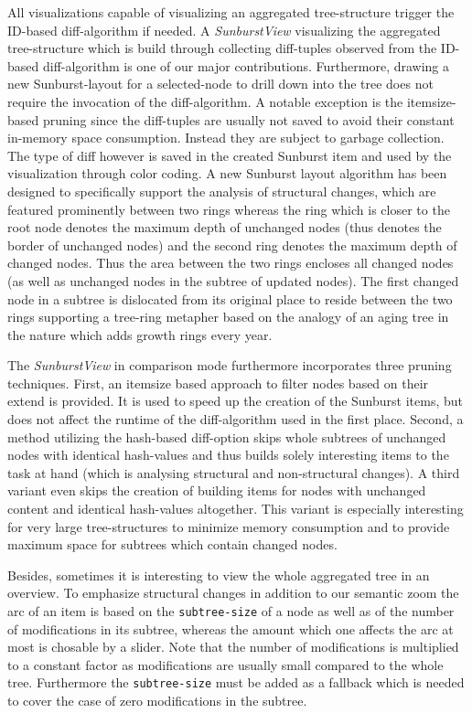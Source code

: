 All visualizations capable of visualizing an aggregated tree-structure trigger the ID-based diff-algorithm if needed. A \emph{SunburstView} visualizing the aggregated tree-structure which is build through collecting diff-tuples observed from the ID-based diff-algorithm is one of our major contributions. Furthermore, drawing a new Sunburst-layout for a selected-node to drill down into the tree does not require the invocation of the diff-algorithm. A notable exception is the itemsize-based pruning since the diff-tuples are usually not saved to avoid their constant in-memory space consumption. Instead they are subject to garbage collection. The type of diff however is saved in the created Sunburst item and used by the visualization through color coding. A new Sunburst layout algorithm has been designed to specifically support the analysis of structural changes, which are featured prominently between two rings whereas the ring which is closer to the root node denotes the maximum depth of unchanged nodes (thus denotes the border of unchanged nodes) and the second ring denotes the maximum depth of changed nodes. Thus the area between the two rings encloses all changed nodes (as well as unchanged nodes in the subtree of updated nodes). The first changed node in a subtree is dislocated from its original place to reside between the two rings supporting a tree-ring metapher based on the analogy of an aging tree in the nature which adds growth rings every year.

The \emph{SunburstView} in comparison mode furthermore incorporates three pruning techniques. First, an itemsize based approach to filter nodes based on their extend is provided. It is used to speed up the creation of the Sunburst items, but does not affect the runtime of the diff-algorithm used in the first place. Second, a method utilizing the hash-based diff-option skips whole subtrees of unchanged nodes with identical hash-values and thus builds solely interesting items to the task at hand (which is analysing structural and non-structural changes). A third variant even skips the creation of building items for nodes with unchanged content and identical hash-values altogether. This variant is especially interesting for very large tree-structures to minimize memory consumption and to provide maximum space for subtrees which contain changed nodes.

Besides, sometimes it is interesting to view the whole aggregated tree in an overview. To emphasize structural changes in addition to our semantic zoom the arc of an item is based on the \texttt{subtree-size} of a node as well as of the number of modifications in its subtree, whereas the amount which one affects the arc at most is chosable by a slider. Note that the number of modifications is multiplied to a constant factor as modifications are usually small compared to the whole tree. Furthermore the \texttt{subtree-size} must be added as a fallback which is needed to cover the case of zero modifications in the subtree.

